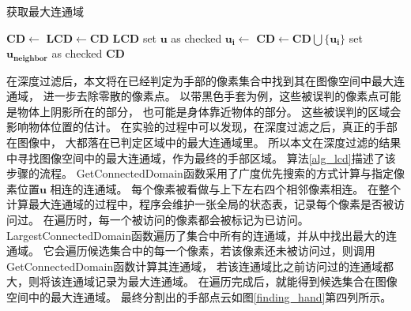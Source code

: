 \begin{algorithm}
    \caption{获取最大连通域}
    \label{alg_lcd}
    \begin{algorithmic}[1]
        \rm
                    \State $\bm{CD} \gets$ 
                        \State $\bm{LCD} \gets  \bm{CD}$
                    \EndIf
                \EndIf
            \EndFor
            \State \Return $\bm{LCD}$
        \EndFunction
            \State {}
            \State set $\bm{u}$ as checked
                \State $\bm{u_i} \gets$ 
                \State $\bm{CD} \gets \bm{CD} \bigcup \{\bm{u_i}\}$
                        \State {}
                        \State set $\bm{u_{neighbor}}$ as checked
                    \EndIf
                \EndFor
            \EndWhile
            \State \Return $\bm{CD}$
        \EndFunction
    \end{algorithmic}
\end{algorithm}
在深度过滤后，本文将在已经判定为手部的像素集合中找到其在图像空间中最大连通域，
进一步去除零散的像素点。
以带黑色手套为例，这些被误判的像素点可能是物体上阴影所在的部分，
也可能是身体靠近物体的部分。
这些被误判的区域会影响物体位置的估计。
在实验的过程中可以发现，在深度过滤之后，真正的手部在图像中，
大都落在已判定区域中的最大连通域里。
所以本文在深度过滤的结果中寻找图像空间中的最大连通域，作为最终的手部区域。
算法\ref{alg_lcd}描述了该步骤的流程。
GetConnectedDomain函数采用了广度优先搜索的方式计算与指定像素位置$\bm{u}$
相连的连通域。
每个像素被看做与上下左右四个相邻像素相连。
在整个计算最大连通域的过程中，程序会维护一张全局的状态表，记录每个像素是否被访问过。
在遍历时，每一个被访问的像素都会被标记为已访问。
LargestConnectedDomain函数遍历了集合中所有的连通域，并从中找出最大的连通域。
它会遍历候选集合中的每一个像素，若该像素还未被访问过，则调用GetConnectedDomain函数计算其连通域，
若该连通域比之前访问过的连通域都大，则将该连通域记录为最大连通域。
在遍历完成后，就能得到候选集合在图像空间中的最大连通域。
最终分割出的手部点云如图\ref{finding_hand}第四列所示。

